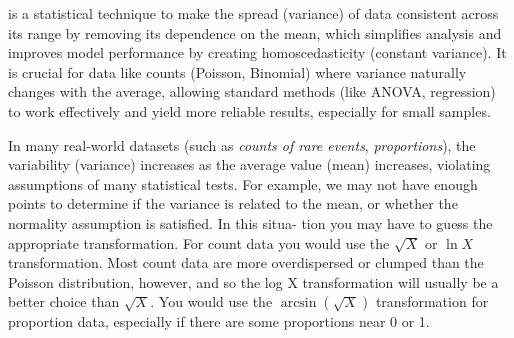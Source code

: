  is a statistical technique to 
make the spread (variance) of data consistent across its range by removing its dependence on the mean, which simplifies 
analysis and improves model performance by creating homoscedasticity (constant variance). It is crucial for data like 
counts (Poisson, Binomial) where variance naturally changes with the average, allowing 
standard methods (like ANOVA, regression) to work effectively and yield more reliable results, especially for small samples. 

In many real-world datasets (such as 
\textit{counts of rare events}, \textit{proportions}), the variability (variance) increases as the average value (mean) increases, 
violating assumptions of many statistical tests. For example,
we may not have enough points to determine if the variance is related to
the mean, or whether the normality assumption is satisfied. In this situa-
tion you may have to guess the appropriate transformation. For count data
you would use the $\sqrt{X}$ or $\ln X$ transformation. Most count data are more
overdispersed or clumped than the Poisson distribution, however, and so the
log X transformation will usually be a better choice than $\sqrt{X}$. You would
use the $\arcsin(\sqrt{X})$ transformation for proportion data, especially if there
are some proportions near 0 or 1.

